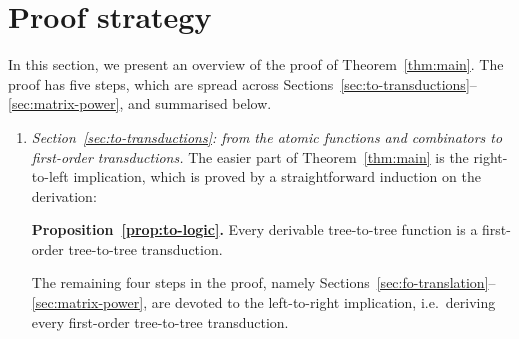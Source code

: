 \section{Proof strategy}
\label{sec:strategy}
In this section, we present an overview of the proof of Theorem~\ref{thm:main}. The proof has five steps, which are spread across Sections~\ref{sec:to-transductions}--\ref{sec:matrix-power}, and summarised below.

\newcommand{\announce}[2]{
\begin{center}
    {\bf #1.} #2
\end{center}
}
\begin{enumerate}
\item \emph{Section~\ref{sec:to-transductions}: from the atomic functions and combinators to first-order transductions.} The easier part of Theorem~\ref{thm:main} is the  right-to-left implication, which is proved by a straightforward induction on the derivation:
\announce
{Proposition~\ref{prop:to-logic}}
{Every derivable tree-to-tree function is a first-order tree-to-tree transduction.}
 
 The remaining four steps in the proof, namely Sections~\ref{sec:fo-translation}--\ref{sec:matrix-power}, are devoted to the left-to-right implication, i.e.~deriving every first-order tree-to-tree transduction.


\end{enumerate}
